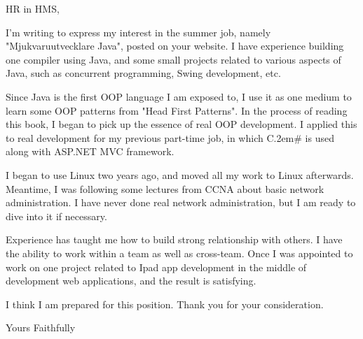 \documentclass{letter}
\begin{document}
\begin{letter}{ }
	\opening{HR in HMS,}
	I'm writing to express my interest in the summer job, namely "Mjukvaruutvecklare Java", posted on your website. I have experience building one 
	compiler using Java, and some small projects related to various aspects of Java, such as concurrent programming, Swing development, etc.

	Since Java is the first OOP language I am exposed to, I use it as one medium to learn some OOP patterns from "Head First Patterns". In the 
	process of reading this book, I began to pick up the essence of real OOP development. I applied this to real development for my previous 
	part-time job, in which C\raise.2em\hbox{{\scriptsize\#}} is used along with ASP.NET MVC framework.

	I began to use Linux two years ago, and moved all my work to Linux afterwards. Meantime, I was following some lectures from CCNA about basic 
	network administration. I have never done real network administration, but I am ready to dive into it if necessary.

	Experience has taught me how to build strong relationship with others. I have the ability to work within a team as well as cross-team. Once I was 
	appointed to work on one project related to Ipad app development in the middle of development web applications, and the result is satisfying.

	I think I am prepared for this position. Thank you for your consideration.
	\closing{Yours Faithfully}
\end{letter}
\end{document}
